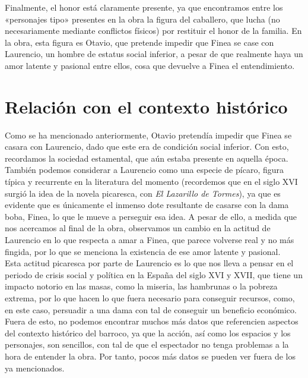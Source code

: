 \documentclass[12pt,a4paper]{article}
\begin{document}
Finalmente, el honor está claramente presente, ya que encontramos entre los «personajes tipo» presentes en la obra la figura del caballero, que lucha (no necesariamente mediante conflictos físicos) por restituir el honor de la familia. En la obra, esta figura es Otavio, que pretende impedir que Finea se case con Laurencio, un hombre de estatus social inferior, a pesar de que realmente haya un amor latente y pasional entre ellos, cosa que devuelve a Finea el entendimiento.

\section{Relación con el contexto histórico}

Como se ha mencionado anteriormente, Otavio pretendía impedir que Finea se casara con Laurencio, dado que este era de condición social inferior. Con esto, recordamos la sociedad estamental, que aún estaba presente en aquella época. También podemos considerar a Laurencio como una especie de pícaro, figura típica y recurrente en la literatura del momento (recordemos que en el siglo XVI surgió la idea de la novela picaresca, con \textit{El Lazarillo de Tormes}), ya que es evidente que es únicamente el inmenso dote resultante de casarse con la dama boba, Finea, lo que le mueve a perseguir esa idea. A pesar de ello, a medida que nos acercamos al final de la obra, observamos un cambio en la actitud de Laurencio en lo que respecta a amar a Finea, que parece volverse real y no más fingida, por lo que se menciona la existencia de ese amor latente y pasional.\\

Esta actitud picaresca por parte de Laurencio es lo que nos lleva a pensar en el periodo de crisis social y política en la España del siglo XVI y XVII, que tiene un impacto notorio en las masas, como la miseria, las hambrunas o la pobreza extrema, por lo que hacen lo que fuera necesario para conseguir recursos, como, en este caso, persuadir a una dama con tal de conseguir un beneficio económico.\\

Fuera de esto, no podemos encontrar muchos más datos que referencien aspectos del contexto histórico del barroco, ya que la acción, así como los espacios y los personajes, son sencillos, con tal de que el espectador no tenga problemas a la hora de entender la obra. Por tanto, pocos más datos se pueden ver fuera de los ya mencionados.
\end{document}
